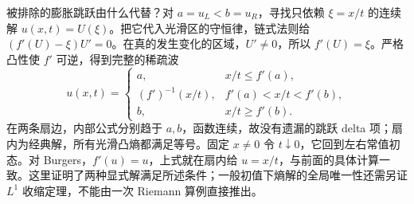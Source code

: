 被排除的膨胀跳跃由什么代替？对 \(a=u_L<b=u_R\)，寻找只依赖 \(\xi=x/t\) 的连续解 \(u(x,t)=U(\xi)\)。把它代入光滑区的守恒律，链式法则给 \((f'(U)-\xi)U'=0\)。在真的发生变化的区域，\(U'\ne0\)，所以 \(f'(U)=\xi\)。严格凸性使 \(f'\) 可逆，得到完整的稀疏波
\begin{equation}
 u(x,t)=
 \begin{cases}
 a,&x/t\le f'(a),\\
 (f')^{-1}(x/t),&f'(a)<x/t<f'(b),\\
 b,&x/t\ge f'(b).
 \end{cases}
 \label{eq:math-convex-rarefaction}
\end{equation}
在两条扇边，内部公式分别趋于 \(a,b\)，函数连续，故没有遗漏的跳跃 delta 项；扇内为经典解，所有光滑凸熵都满足等号。固定 \(x\ne0\) 令 \(t\downarrow0\)，它回到左右常值初态。对 Burgers，\(f'(u)=u\)，上式就在扇内给 \(u=x/t\)，与前面的具体计算一致。这里证明了两种显式解满足所述条件；一般初值下熵解的全局唯一性还需另证 \(L^1\) 收缩定理，不能由一次 Riemann 算例直接推出。


